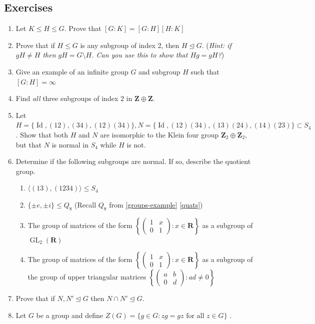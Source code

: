 \documentclass[12pt]{article}
\numberwithin{equation}{subsection}
\theoremstyle{note}
\newcommand{\GL}{\operatorname{GL}}
\newcommand{\Id}{\operatorname{Id}}
\newcommand{\nrml}{\trianglelefteq}
\begin{document}
\subsection{Exercises}
\begin{enumerate}[label=\arabic*.]
	\item Let $K\leq H \leq G$. Prove that $[G:K]=[G:H][H:K]$
	\item \label{subgroup-of-index-2} Prove that if $H\leq G$ is any subgroup of index 2, then $H\nrml G$. (\textit{Hint: if $gH\neq H$ then $gH=G\setminus H$. Can you use this to show that $Hg=gH$?})
	\item Give an example of an infinite group $G$ and subgroup $H$ such that $[G:H]=\infty$
	\item Find \textit{all} three subgroups of index $2$ in $\mathbf{Z}\oplus \mathbf{Z}$.
	\item Let $H=\{ \Id, (12), (34), (12)(34)\}, N=\{\Id, (12)(34), (13)(24), (14)(23)\} \subset S_4$. Show that both $H$ and $N$ are isomorphic to the Klein four group $\mathbf{Z}_2\oplus \mathbf{Z}_2$, but that $N$ is normal in $S_4$ while $H$ is not. 
	\item Determine if the following subgroups are normal. If so, describe the quotient group.
		\begin{enumerate}
			\item $\langle (13), (1234) \rangle \leq S_4$
			\item $\{\pm e,  \pm i \} \leq Q_8$ \qquad (Recall $Q_8$ from \ref{groups-example} \ref{quats})
			\item The group of matrices of the form $\left \{ \begin{pmatrix} 1 & x \\ 0 & 1\end{pmatrix} : x\in \mathbf{R}\right\}$ as a subgroup of $\GL_2(\mathbf{R})$
			\item The group of matrices of the form $\left \{ \begin{pmatrix} 1 & x \\ 0 & 1\end{pmatrix} : x\in \mathbf{R}\right\}$ as a subgroup of the group of upper triangular matrices $\left \{ \begin{pmatrix} a & b \\ 0 & d\end{pmatrix} : ad\neq 0\right\}$
		\end{enumerate}
	\item Prove that if $N,N'\nrml G$ then $N\cap N'\nrml G$.
	\item Let $G$ be a group and define $Z(G)=\{g\in G: zg=gz \text{ for all $z\in G$}\}$ .

\end{enumerate}
\end{document}
